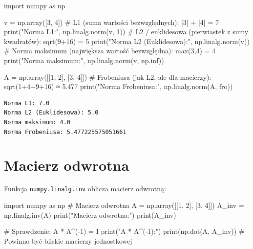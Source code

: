 \documentclass[
  polish,
  letterpaper,
  DIV=11,
  numbers=noendperiod]{scrreprt}
\newenvironment{Shaded}{\begin{snugshade}}{\end{snugshade}}
\newcommand{\BuiltInTok}[1]{\textcolor[rgb]{0.00,0.23,0.31}{#1}}
\newcommand{\CommentTok}[1]{\textcolor[rgb]{0.37,0.37,0.37}{#1}}
\newcommand{\DecValTok}[1]{\textcolor[rgb]{0.68,0.00,0.00}{#1}}
\newcommand{\ImportTok}[1]{\textcolor[rgb]{0.00,0.46,0.62}{#1}}
\newcommand{\NormalTok}[1]{\textcolor[rgb]{0.00,0.23,0.31}{#1}}
\newcommand{\OperatorTok}[1]{\textcolor[rgb]{0.37,0.37,0.37}{#1}}
\newcommand{\StringTok}[1]{\textcolor[rgb]{0.13,0.47,0.30}{#1}}
\begin{document}
\begin{Shaded}
\begin{Highlighting}[]
\ImportTok{import}\NormalTok{ numpy }\ImportTok{as}\NormalTok{ np}

\NormalTok{v }\OperatorTok{=}\NormalTok{ np.array([}\DecValTok{3}\NormalTok{, }\DecValTok{4}\NormalTok{])}
\CommentTok{\# L1 (suma wartości bezwzględnych): |3| + |4| = 7}
\BuiltInTok{print}\NormalTok{(}\StringTok{"Norma L1:"}\NormalTok{, np.linalg.norm(v, }\DecValTok{1}\NormalTok{))}
\CommentTok{\# L2 / euklidesowa (pierwiastek z sumy kwadratów): sqrt(9+16) = 5}
\BuiltInTok{print}\NormalTok{(}\StringTok{"Norma L2 (Euklidesowa):"}\NormalTok{, np.linalg.norm(v))}
\CommentTok{\# Norma maksimum (największa wartość bezwzględna): max(3,4) = 4}
\BuiltInTok{print}\NormalTok{(}\StringTok{"Norma maksimum:"}\NormalTok{, np.linalg.norm(v, np.inf))}

\NormalTok{A }\OperatorTok{=}\NormalTok{ np.array([[}\DecValTok{1}\NormalTok{, }\DecValTok{2}\NormalTok{], [}\DecValTok{3}\NormalTok{, }\DecValTok{4}\NormalTok{]])}
\CommentTok{\# Frobeniusa (jak L2, ale dla macierzy): sqrt(1+4+9+16) ≈ 5.477}
\BuiltInTok{print}\NormalTok{(}\StringTok{"Norma Frobeniusa:"}\NormalTok{, np.linalg.norm(A, }\StringTok{\textquotesingle{}fro\textquotesingle{}}\NormalTok{))}
\end{Highlighting}
\end{Shaded}

\begin{verbatim}
Norma L1: 7.0
Norma L2 (Euklidesowa): 5.0
Norma maksimum: 4.0
Norma Frobeniusa: 5.477225575051661
\end{verbatim}

\section{Macierz odwrotna}\label{macierz-odwrotna}

Funkcja \texttt{numpy.linalg.inv} oblicza macierz odwrotną:

\begin{Shaded}
\begin{Highlighting}[]
\ImportTok{import}\NormalTok{ numpy }\ImportTok{as}\NormalTok{ np}
\CommentTok{\# Macierz odwrotna}
\NormalTok{A }\OperatorTok{=}\NormalTok{ np.array([[}\DecValTok{1}\NormalTok{, }\DecValTok{2}\NormalTok{], [}\DecValTok{3}\NormalTok{, }\DecValTok{4}\NormalTok{]])}
\NormalTok{A\_inv }\OperatorTok{=}\NormalTok{ np.linalg.inv(A)}
\BuiltInTok{print}\NormalTok{(}\StringTok{"Macierz odwrotna:"}\NormalTok{)}
\BuiltInTok{print}\NormalTok{(A\_inv)}

\CommentTok{\# Sprawdzenie: A * A\^{}({-}1) = I}
\BuiltInTok{print}\NormalTok{(}\StringTok{"A * A\^{}({-}1):"}\NormalTok{)}
\BuiltInTok{print}\NormalTok{(np.dot(A, A\_inv))  }\CommentTok{\# Powinno być bliskie macierzy jednostkowej}
\end{Highlighting}
\end{Shaded}
\end{document}
